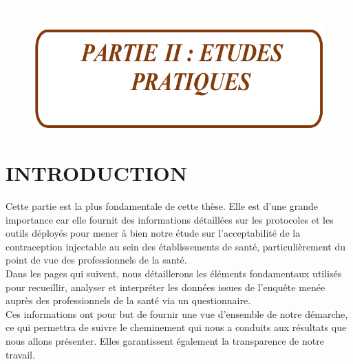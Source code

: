 \pagebreak

\begin{itemize}
  \item[\textcolor{white}{$\Box$}] 
\end{itemize}


\vspace{7cm}

\begin{figure}[H]
  \includegraphics{Images/part_iii.png}
\end{figure}

\section*{}

\pagebreak


\setcounter{section}{0} %
\section{INTRODUCTION}

Cette partie est la plus fondamentale de cette thèse. Elle est d’une grande importance car elle fournit des informations détaillées sur les protocoles et les outils déployés pour mener à bien notre étude sur l’acceptabilité de la contraception injectable au sein des établissements de santé, particulièrement du point de vue des professionnels de la santé. \\

\noindent Dans les pages qui suivent, nous détaillerons les éléments fondamentaux utilisés pour recueillir, analyser et interpréter les données issues de l’enquête menée auprès des professionnels de la santé via un questionnaire. \\    

\noindent Ces informations ont pour but de fournir une vue d’ensemble de notre démarche, ce qui permettra de suivre le cheminement qui nous a conduits aux résultats que nous allons présenter. Elles garantissent également la transparence de notre travail.

